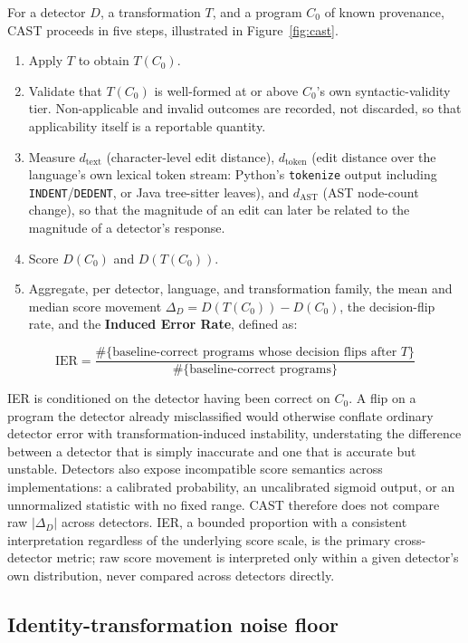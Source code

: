 \documentclass[sigconf,review,anonymous]{acmart}
\begin{document}
For a detector $D$, a transformation $T$, and a program $C_0$ of known provenance, CAST proceeds in five steps, illustrated in Figure~\ref{fig:cast}.
\begin{enumerate}
\item Apply $T$ to obtain $T(C_0)$.
\item Validate that $T(C_0)$ is well-formed at or above $C_0$'s own syntactic-validity tier. Non-applicable and invalid outcomes are recorded, not discarded, so that applicability itself is a reportable quantity.
\item Measure $d_\text{text}$ (character-level edit distance), $d_\text{token}$ (edit distance over the language's own lexical token stream: Python's \texttt{tokenize} output including \texttt{INDENT}/\texttt{DEDENT}, or Java tree-sitter leaves), and $d_\text{AST}$ (AST node-count change), so that the magnitude of an edit can later be related to the magnitude of a detector's response.
\item Score $D(C_0)$ and $D(T(C_0))$.
\item Aggregate, per detector, language, and transformation family, the mean and median score movement $\Delta_D = D(T(C_0)) - D(C_0)$, the decision-flip rate, and the \textbf{Induced Error Rate}, defined as:
\end{enumerate}
\begin{equation}
\text{IER} = \frac{\#\{\text{baseline-correct programs whose decision flips after } T\}}{\#\{\text{baseline-correct programs}\}}
\end{equation}

IER is conditioned on the detector having been correct on $C_0$. A flip on a program the detector already misclassified would otherwise conflate ordinary detector error with transformation-induced instability, understating the difference between a detector that is simply inaccurate and one that is accurate but unstable. Detectors also expose incompatible score semantics across implementations: a calibrated probability, an uncalibrated sigmoid output, or an unnormalized statistic with no fixed range. CAST therefore does not compare raw $|\Delta_D|$ across detectors. IER, a bounded proportion with a consistent interpretation regardless of the underlying score scale, is the primary cross-detector metric; raw score movement is interpreted only within a given detector's own distribution, never compared across detectors directly.

\subsection{Identity-transformation noise floor}
\label{sec:noise-floor}
\end{document}
